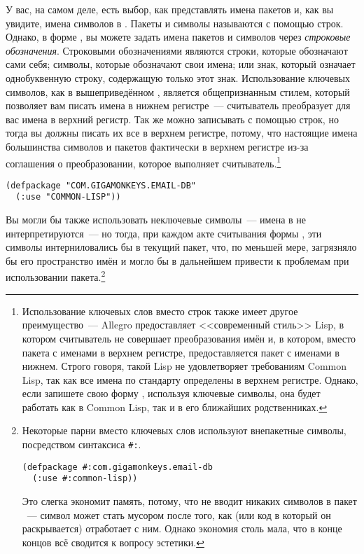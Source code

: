 У вас, на самом деле, есть выбор, как представлять имена пакетов и, как вы увидите, имена
символов в . Пакеты и символы называются с помощью строк. Однако, в форме
, вы можете задать имена пакетов и символов через \textit{строковые
  обозначения}. Строковыми обозначениями являются строки, которые обозначают сами себя;
символы, которые обозначают свои имена; или знак, который означает однобуквенную строку,
содержащую только этот знак. Использование ключевых символов, как в вышеприведённом
, является общепризнанным стилем, который позволяет вам писать имена в
нижнем регистре~--- считыватель преобразует для вас имена в верхний регистр.  Так же можно
записывать  с помощью строк, но тогда вы должны писать их все в верхнем
регистре, потому, что настоящие имена большинства символов и пакетов фактически в верхнем
регистре из-за соглашения о преобразовании, которое выполняет
считыватель.\footnote{Использование ключевых слов вместо строк также имеет другое
  преимущество~--- Allegro предоставляет <<современный стиль>> Lisp, в котором считыватель
  не совершает преобразования имён и, в котором, вместо пакета  с
  именами в верхнем регистре, предоставляется пакет  с именами в нижнем.
  Строго говоря, такой Lisp не удовлетворяет требованиям Common Lisp, так как все имена по
  стандарту определены в верхнем регистре. Однако, если запишете свою форму
  , используя ключевые символы, она будет работать как в Common Lisp, так
  и в его ближайших родственниках.}

\begin{lstlisting}
(defpackage "COM.GIGAMONKEYS.EMAIL-DB"
  (:use "COMMON-LISP"))
\end{lstlisting}

Вы могли бы также использовать неключевые символы~--- имена в  не
интерпретируются~--- но тогда, при каждом акте считывания формы , эти
символы интерниловались бы в текущий пакет, что, по меньшей мере, загрязняло бы его
пространство имён и могло бы в дальнейшем привести к проблемам при использовании
пакета.\footnote{Некоторые парни вместо ключевых слов используют внепакетные символы,
  посредством синтаксиса \lstinline!#:!.

\begin{lstlisting}
(defpackage #:com.gigamonkeys.email-db
  (:use #:common-lisp))
\end{lstlisting}

Это слегка экономит память, потому, что не вводит никаких символов в пакет 
~--- символ может стать мусором после того, как  (или код в который он
раскрывается) отработает с ним. Однако экономия столь мала, что в конце концов всё сводится
к вопросу эстетики.}

